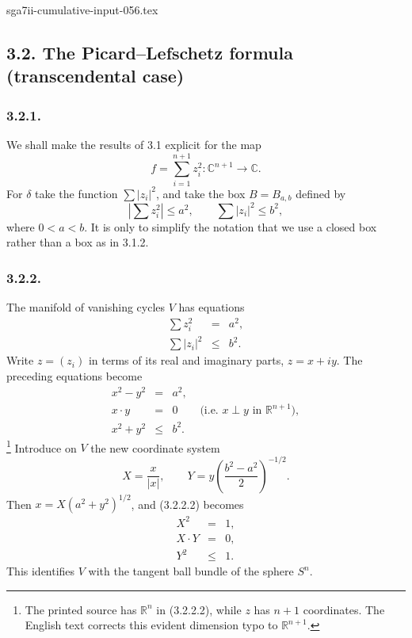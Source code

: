 \begin{filecontents*}{sga7ii-cumulative-input-056.tex}
\subsection*{3.2. The Picard--Lefschetz formula (transcendental case)}

\subsubsection*{3.2.1.}
We shall make the results of 3.1 explicit for the map
\[
f=\sum_{i=1}^{n+1}z_i^2:\mathbb C^{n+1}\longrightarrow\mathbb C.
\]
For $\delta$ take the function $\sum |z_i|^2$, and take the box
$B=B_{a,b}$ defined by
\[
\left|\sum z_i^2\right|\leq a^2,
\qquad
\sum |z_i|^2\leq b^2,
\]
where $0<a<b$.  It is only to simplify the notation that we use a
closed box rather than a box as in 3.1.2.

\subsubsection*{3.2.2.}
The manifold of vanishing cycles $V$ has equations
\begin{equation}\tag{3.2.2.1}
\begin{array}{rcl}
\displaystyle\sum z_i^2&=&a^2,\\
\displaystyle\sum |z_i|^2&\leq&b^2.
\end{array}
\end{equation}
Write $z=(z_i)$ in terms of its real and imaginary parts,
$z=x+iy$.  The preceding equations become
\begin{equation}\tag{3.2.2.2}
\begin{array}{rcl}
x^2-y^2&=&a^2,\\
x\mathbin{\cdot}y&=&0
  \qquad\bigl(\text{i.e. }x\perp y\text{ in }\mathbb R^{n+1}\bigr),\\
x^2+y^2&\leq&b^2.
\end{array}
\end{equation}
\footnote{The printed source has $\mathbb R^n$ in (3.2.2.2), while
$z$ has $n+1$ coordinates.  The English text corrects this evident
dimension typo to $\mathbb R^{n+1}$.}
Introduce on $V$ the new coordinate system
\[
X=\frac{x}{|x|},
\qquad
Y=y\left(\frac{b^2-a^2}{2}\right)^{-1/2}.
\]
Then $x=X(a^2+y^2)^{1/2}$, and (3.2.2.2) becomes
\begin{equation}\tag{3.2.2.3}
\begin{array}{rcl}
X^2&=&1,\\
X\mathbin{\cdot}Y&=&0,\\
Y^2&\leq&1.
\end{array}
\end{equation}
This identifies $V$ with the tangent ball bundle of the sphere $S^n$.


\end{filecontents*}
